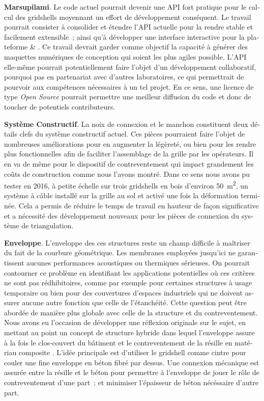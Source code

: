 \begin{otherlanguage}{french}
    \textbf{Marsupilami}. Le code actuel pourrait devenir une API \Csharp{} fort pratique pour le calcul des gridshells moyennant un effort de développement conséquent. Le travail pourrait consister à consolider et étendre l'API actuelle pour la rendre stable et facilement extensible~; ainsi qu'à développer une interface interactive pour la plateforme \rhino{} \& \grasshopper{}. Ce travail devrait garder comme objectif la capacité à générer des maquettes numériques de conception qui soient les plus agiles possible. L'API elle-même pourrait potentiellement faire l'objet d'un développement collaboratif, pourquoi pas en partenariat avec d'autres laboratoires, ce qui permettrait de pourvoir aux compétences nécessaires à un tel projet. En ce sens, une licence de type \emph{Open Source} pourrait permettre une meilleur diffusion du code et donc de toucher de potentiels contributeurs.
    
    \textbf{Système Constructif}. La noix de connexion et le manchon constituent deux détails clefs du système constructif actuel. Ces pièces pourraient faire l'objet de nombreuses améliorations pour en augmenter la légèreté, ou bien pour les rendre plus fonctionnelles afin de faciliter l'assemblage de la grille par les opérateurs. Il en va de même pour le dispositif de contreventement qui impact grandement les coûts de construction comme nous l'avons montré. Dans ce sens nous avons pu tester en 2016, à petite échelle sur trois gridshells en bois d'environ \SI{50}{m^2}, un système à câble installé sur la grille au sol et activé une fois la déformation terminée. Cela a permis de réduire le temps de travail en hauteur de façon significative et a nécessité des développement nouveaux pour les pièces de connexion du système de triangulation.

    \textbf{Enveloppe}. L'enveloppe des ces structures reste un champ difficile à maîtriser du fait de la courbure géométrique. Les membranes employées jusqu'ici ne garantissent aucunes performances acoustiques ou thermiques sérieuses. On pourrait contourner ce problème en identifiant les applications potentielles où ces critères ne sont pas rédhibitoires, comme par exemple pour certaines structures à usage temporaire ou bien pour des couvertures d'espaces industriels qui ne doivent assurer aucune autre fonction que celle de l'étanchéité. Cette question peut être abordée de manière plus globale avec celle de la structure et du contreventement. Nous avons eu l'occasion de développer une réflexion originale sur le sujet, en mettant au point un concept de structure hybride dans lequel l'enveloppe assure à la fois le clos-couvert du bâtiment et le contreventement de la résille en matériau composite \cite{Cuvilliers2017}. L'idée principale est d'utiliser le gridshell comme cintre pour couler une fine enveloppe en béton fibré par dessus. Une connexion mécanique est assurée entre la résille et le béton pour permettre à l'enveloppe de jouer le rôle de contreventement d'une part~; et minimiser l'épaisseur de béton nécéssaire d'autre part.


\end{otherlanguage}
